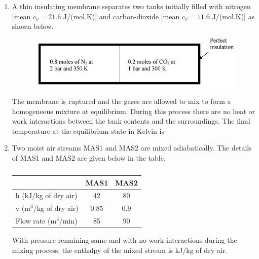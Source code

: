 \documentclass[a4paper,10pt]{article}
\begin{document}
\begin{enumerate}
    \item A thin insulating membrane separates two tanks initially filled with nitrogen [mean $c_v = 21.6$ J/(mol.K)] and carbon-dioxide [mean $c_v = 11.6$ J/(mol.K)] as shown below.
    \begin{figure}[H] \centering \includegraphics[width=0.7\columnwidth]{q20_thermo.png} \caption*{} \label{fig:q20_thermo} \end{figure}
    The membrane is ruptured and the gases are allowed to mix to form a homogeneous mixture at equilibrium. During this process there are no heat or work interactions between the tank contents and the surroundings. The final temperature at the equilibrium state in Kelvin is
    
    \hfill{}
    \begin{enumerate}
    \end{enumerate}

    \item Two moist air streams MAS1 and MAS2 are mixed adiabatically. The details of MAS1 and MAS2 are given below in the table.
    \begin{table}[h!] \centering \caption*{} \label{tab:q21_thermo}
        \begin{tabular}{|l|c|c|} \hline
            & MAS1 & MAS2 \\ \hline
            h (kJ/kg of dry air) & 42 & 80 \\ \hline
            v (m$^3$/kg of dry air) & 0.85 & 0.9 \\ \hline
            Flow rate (m$^3$/min) & 85 & 90 \\ \hline
        \end{tabular}
    \end{table}
    With pressure remaining same and with no work interactions during the mixing process, the enthalpy of the mixed stream is \underline{\hspace{2cm}} kJ/kg of dry air.
    

\end{enumerate}
\end{document}
